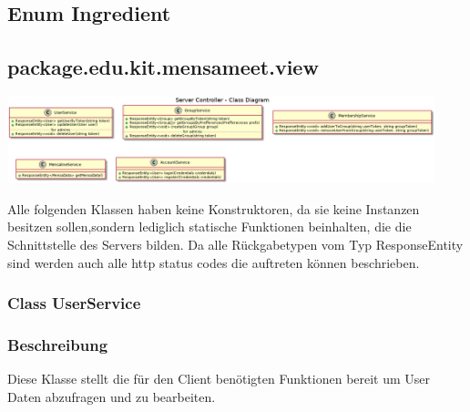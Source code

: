 \documentclass[a4paper]{scrreprt}
\begin{document}
\subsection{Enum Ingredient}




\subsection{package.edu.kit.mensameet.view}

\begin{center}
	\includegraphics[width=0.93\textwidth]{Klassendiagramme/serverViewCD.png}
\end{center}


Alle folgenden Klassen haben keine Konstruktoren, da sie keine Instanzen besitzen sollen,sondern lediglich statische Funktionen beinhalten, die die Schnittstelle des Servers bilden. Da alle Rückgabetypen vom Typ ResponseEntity sind werden auch alle http status codes die auftreten können beschrieben.

\subsubsection{Class UserService}
\subsubsection*{Beschreibung}
Diese Klasse stellt die für den Client benötigten Funktionen bereit um User Daten abzufragen und zu bearbeiten. 
\end{document}
